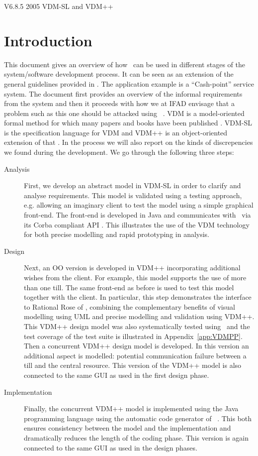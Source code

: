 \documentclass[\pformat,12pt,twoside]{article}
\newcommand{\vdmtoolsver}{V6.8.5}
\begin{document}
       {\vdmtoolsver}
       {2005}
       {VDM-SL and VDM++}

\section{Introduction}


This document gives an overview of how
\vdmtools\ can be used in
different stages of the system/software development process. It can be
seen as an extension of the general guidelines provided in
\cite{Guidelines}. The
application example is a ``Cash-point'' service system. The document
first provides an overview of the informal requirements from the
system and then it proceeds with how we at IFAD envisage that a
problem such as this one should be attacked using
\vdmtools\ \cite{Mukherjee95a,Elmstrom&94}. VDM is a
model-oriented formal method for which many papers and books have been
published \cite{Jones90a,Fitzgerald&98b}. VDM-SL is the specification
language for VDM \cite{ISOVDM96} and VDM++ is an object-oriented
extension of that \cite{LangManPP}.
In the process we will also report on the kinds of discrepencies we found
during the development. We go 
through the following three steps:


\begin{description}
\item[Analysis] First, we develop an abstract model in VDM-SL in 
order to clarify and analyse requirements. This model is validated 
using a testing approach, e.g. allowing an imaginary client to 
test the model using a simple graphical front-end. The front-end 
is developed in Java and communicates with \vdmtools\  
via its Corba compliant API \cite{OMG&96,APIMan}. This illustrates the use of the 
VDM technology for both precise modelling and rapid prototyping 
in analysis.
\item[Design] Next, an OO version is developed in VDM++ incorporating
additional wishes from the client. For example, this model supports
the use of more than one till. The same front-end as before is used to
test this model together with the client. In particular, this step
demonstrates the interface to Rational Rose \cite{Rose&00} of
\vdmtools, combining the complementary benefits of visual modelling
using UML and precise modelling and validation using VDM++. This VDM++
design model was also systematically tested using \vdmtools\ and the
test coverage of the test suite is illustrated in
Appendix~\ref{app:VDMPP}.  Then a concurrent VDM++ design model is
developed. In this version an additional aspect is modelled: potential
communication failure between a till and the central resource. This
version of the VDM++ model is also connected to the same GUI as used
in the first design phase.
\item[Implementation] Finally, the concurrent VDM++ model is
implemented using the Java programming language \cite{Gosling&00} using the automatic code
generator of \vdmtools\ \cite{CGJavaManPP}.  This both ensures
consistency between the model and the implementation and dramatically
reduces the length of the coding phase. This version is again
connected to the same GUI as used in the design phases.
\end{description}
\end{document}

